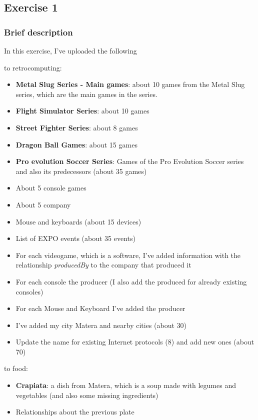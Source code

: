 \subsection{Exercise 1}

\subsubsection{Brief description}

In this exercise, I've uploaded the following 

to retrocomputing:
\begin{itemize}
    \item \textbf{Metal Slug Series - Main games}: about 10 games from the Metal Slug series, which are the main games in the series.
    \item \textbf{Flight Simulator Series}: about 10 games
    \item \textbf{Street Fighter Series}: about 8 games
    \item \textbf{Dragon Ball Games}: about 15 games
    \item \textbf{Pro evolution Soccer Series}: Games of the Pro Evolution Soccer series and also its predecessors (about 35 games)
    \item About 5 console games
    \item About 5 company
    \item Mouse and keyboards (about 15 devices)
    \item List of EXPO events (about 35 events)
    \item For each videogame, which is a software, I've added information with the relationship \textit{producedBy} to the company that produced it
    \item For each console the producer (I also add the produced for already existing consoles)
    \item For each Mouse and Keyboard I've added the producer
    \item I've added my city Matera and nearby cities (about 30)
    \item Update the name for existing Internet protocols (8) and add new ones (about 70)
   
\end{itemize}

to food:
\begin{itemize}
    \item \textbf{Crapiata}: a dish from Matera, which is a soup made with legumes and vegetables (and also some missing ingredients)
    \item Relationships about the previous plate
\end{itemize}




